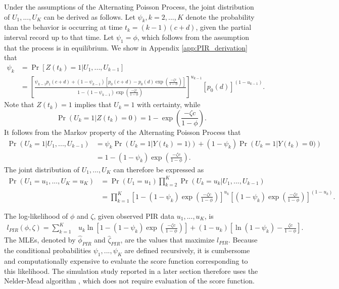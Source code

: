 \documentclass[man, noextraspace, floatsintext]{apa6}\usepackage[]{graphicx}\usepackage[]{color}
\begin{document}
Under the assumptions of the Alternating Poisson Process, the joint distribution of $U_1,...,U_K$ can be derived as follows. 
Let $\psi_k, k = 2,...,K$ denote the probability than the behavior is occurring at time $t_k = (k-1)(c + d)$, given the partial interval record up to that time. 
Let $\psi_1 = \phi$, which follows from the assumption that the process is in equilibrium. We show in Appendix \ref{app:PIR_derivation} that  
\begin{equation}
\label{eq:psi_k}
\begin{aligned}
\psi_k &= \Pr\left[ Z(t_k) = 1 \left| U_1,...,U_{k-1}\right.\right] \\
 &= \left[\frac{\psi_{k-1} p_1(c + d) + (1 - \psi_{k-1}) \left[p_0(c + d) - p_0(d) \exp\left(\frac{- \zeta c}{1 - \phi}\right)\right]}{1 - (1 - \psi_{k-1})\exp\left( \frac{-\zeta c}{1 - \phi}\right)}\right]^{u_{k-1}} \left[p_0(d)\right]^{(1 - u_{k-1})}.
\end{aligned}
\end{equation}
Note that $Z(t_k) = 1$ implies that $U_k = 1$ with certainty, while 
\[ \Pr\left(U_k = 1\left| Z(t_k) = 0\right.\right) = 1 - \exp\left( \frac{-\zeta c}{1 - \phi}\right).\]
It follows from the Markov property of the Alternating Poisson Process that 
\begin{align*}
\Pr\left(U_k = 1 \left| U_1,...,U_{k-1}\right.\right) &= \psi_k \Pr\left(U_k = 1 \left| Y(t_k) = 1)\right.\right)  + (1 - \psi_k)\Pr\left(U_k = 1 \left| Y(t_k) = 0)\right.\right) \\
&= 1 - (1 - \psi_k)\exp\left( \frac{-\zeta c}{1 - \phi}\right).
\end{align*}
The joint distribution of $U_1,...,U_K$ can therefore be expressed as 
\begin{align*}
\Pr\left(U_1=u_1,...,U_K = u_K\right) &= \Pr\left(U_1=u_1\right) \prod_{k=2}^K \Pr\left(U_k=u_k \left| U_1,...,U_{k-1}\right.\right) \nonumber \\
&= \prod_{k=1}^K \left[1 - (1 - \psi_k)\exp\left( \frac{-\zeta c}{1 - \phi}\right) \right]^{u_k} \left[(1 - \psi_k)\exp\left( \frac{-\zeta c}{1 - \phi}\right)\right]^{(1 - u_k)}.
\end{align*}

The log-likelihood of $\phi$ and $\zeta$, given observed PIR data $u_1,...,u_K$, is
\begin{align}
\label{eq:PIR_loglik}
l_{PIR}\left(\phi,\zeta\right) = \sum_{k=1}^K & u_k \ln\left[1 - (1 - \psi_k)\exp\left( \frac{-\zeta c}{1 - \phi}\right)\right]  + (1 - u_k)\left[\ln\left(1 - \psi_k \right) - \frac{\zeta c}{1 - \phi}\right].
\end{align}
The MLEs, denoted by $\hat\phi_{PIR}$ and $\hat\zeta_{PIR}$, are the values that maximize $l_{PIR}$. 
Because the conditional probabilities $\psi_1,...,\psi_K$ are defined recursively, it is cumbersome and computationally expensive to evaluate the score function corresponding to this likelihood. 
The simulation study reported in a later section therefore uses the Nelder-Mead algorithm \citep{Nelder1965simplex}, which does not require evaluation of the score function.
\end{document}

